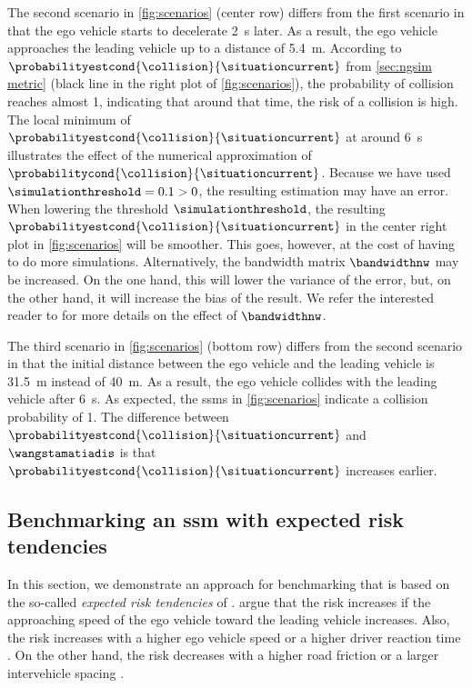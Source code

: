 The second scenario in \cref{fig:scenarios} (center row) differs from the first scenario in that the ego vehicle starts to decelerate \SI{2}{\second} later.
As a result, the ego vehicle approaches the leading vehicle up to a distance of \SI{5.4}{\meter}.
According to $\probabilityestcond{\collision}{\situationcurrent}$ from \cref{sec:ngsim metric} (black line in the right plot of \cref{fig:scenarios}), the probability of collision reaches almost 1, indicating that around that time, the risk of a collision is high.
The local minimum of $\probabilityestcond{\collision}{\situationcurrent}$ at around \SI{6}{\second} illustrates the effect of the numerical approximation of $\probabilitycond{\collision}{\situationcurrent}$.
Because we have used $\simulationthreshold=0.1>0$, the resulting estimation may have an error. 
When lowering the threshold $\simulationthreshold$, the resulting $\probabilityestcond{\collision}{\situationcurrent}$ in the center right plot in \cref{fig:scenarios} will be smoother. 
This goes, however, at the cost of having to do more simulations.
Alternatively, the bandwidth matrix $\bandwidthnw$ may be increased. 
On the one hand, this will lower the variance of the error, but, on the other hand, it will increase the bias of the result.
We refer the interested reader to \autocite{chen2017tutorial} for more details on the effect of $\bandwidthnw$.

The third scenario in \cref{fig:scenarios} (bottom row) differs from the second scenario in that the initial distance between the ego vehicle and the leading vehicle is \SI{31.5}{\meter} instead of \SI{40}{\meter}. 
As a result, the ego vehicle collides with the leading vehicle after \SI{6}{\second}.
As expected, the \acp{ssm} in \cref{fig:scenarios} indicate a collision probability of 1.
The difference between $\probabilityestcond{\collision}{\situationcurrent}$ and $\wangstamatiadis$ is that $\probabilityestcond{\collision}{\situationcurrent}$ increases earlier. 



\subsection{Benchmarking an \acs{ssm} with expected risk tendencies}
\label{sec:tendencies}

In this section, we demonstrate an approach for benchmarking  that is based on the so-called \emph{expected risk tendencies} of \textcite{mullakkal2017comparative}.
\textcite{mullakkal2017comparative} argue that the risk increases if the approaching speed of the ego vehicle toward the leading vehicle increases.
Also, the risk increases with a higher ego vehicle speed \autocite{aarts2006driving} or a higher driver reaction time \autocite{klauer2006impact}.
On the other hand, the risk decreases with a higher road friction \autocite{wallman2001friction} or a larger intervehicle spacing \autocite{mullakkal2017comparative}.

